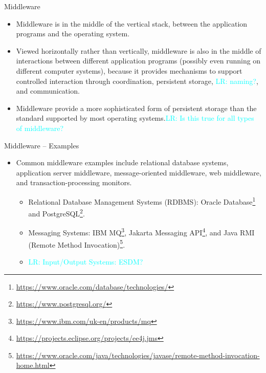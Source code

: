 \documentclass[compress,11pt,xcolor=svgnames,aspectratio=169]{beamer}
\newcommand{\lr}[1]{\textcolor{cyan}{LR: #1}}
\begin{document}
\begin{frame}[fragile]{Middleware}

\begin{itemize}
\setlength\itemsep{0.6cm}

  \item Middleware is in the middle of the vertical stack, between the application programs and the operating system.

  \item Viewed horizontally rather than vertically, middleware is also in the middle of interactions between different application programs (possibly even running on different computer systems), because it provides mechanisms to support controlled interaction through coordination, persistent storage, \lr{naming?}, and communication.

  \item Middleware provide a more sophisticated form of persistent storage than the standard supported by most operating systems.\lr{Is this true for all types of middleware?}

\end{itemize}

\nocite{hailperin2006operating}

\end{frame}

\begin{frame}[fragile]{Middleware -- Examples}

\begin{itemize}
\setlength\itemsep{0.6cm}

\item Common middleware examples include relational database systems, application server middleware, message-oriented middleware, web middleware, and transaction-processing monitors.

  \begin{itemize}
  \setlength\itemsep{0.4cm}

  \item Relational Database Management Systems (RDBMS): Oracle Database\footnote{\tiny \url{https://www.oracle.com/database/technologies/}} and PostgreSQL\footnote{\tiny \url{https://www.postgresql.org/}}.

  \item Messaging Systems: IBM MQ\footnote{\tiny \url{https://www.ibm.com/uk-en/products/mq}}, Jakarta Messaging API\footnote{\tiny \url{https://projects.eclipse.org/projects/ee4j.jms}}, and Java RMI (Remote Method Invocation)\footnote{\tiny \url{https://www.oracle.com/java/technologies/javase/remote-method-invocation-home.html}}.

  \item \lr{Input/Output Systems: ESDM?}

  \end{itemize}

\end{itemize}

\nocite{hailperin2006operating}

\end{frame}
\end{document}
